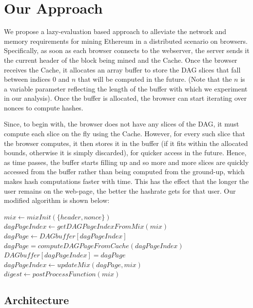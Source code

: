 \documentclass[runningheads]{llncs}
\newcommand{\trishita}[1]{{\color{magenta}\bfseries[Trishita: #1]}}
\begin{document}
\section{Our Approach}
\label{sec:approach}
We propose a lazy-evaluation based approach to alleviate the network and memory requirements for mining Ethereum in a distributed scenario on browsers. Specifically, as soon as each browser connects to the webserver, the server sends it the current header of the block being mined and the Cache. Once the browser receives the Cache, it allocates an array buffer to store the DAG slices that fall between indices 0 and $n$ that will be computed in the future. (Note that the $n$ is a variable parameter reflecting the length of the buffer with which we experiment in our analysis). Once the buffer is allocated, the browser can start iterating over nonces to compute hashes.  

Since, to begin with, the browser does not have any slices of the DAG, it must compute each slice on the fly using the Cache. However, for every such slice that the browser computes, it then stores it in the buffer (if it fits within the allocated bounds, otherwise it is simply discarded), for quicker access in the future. Hence, as time passes, the buffer starts filling up and so more and more slices are quickly accessed from the buffer rather than being computed from the ground-up, which makes hash computations faster with time. This has the effect that the longer the user remains on the web-page, the better the hashrate gets for that user. Our modified algorithm is shown below:

\begin{algorithmic}[H]
\label{modifiedMiningAlgo}
\STATE $mix \gets mixInit(\{header,nonce\})$
  \STATE $dagPageIndex \gets getDAGPageIndexFromMix(mix)$
  \STATE $dagPage \gets DAGbuffer[dagPageIndex]$
		\STATE $dagPage = computeDAGPageFromCache(dagPageIndex)$
        \STATE $DAGbuffer[dagPageIndex] = dagPage$
  \ENDIF  
  \STATE $dagPageIndex \gets updateMix(dagPage,mix)$
\ENDFOR
\STATE $digest \gets postProcessFunction(mix)$
	\RETURN \TRUE
\ENDIF
\RETURN \FALSE
\end{algorithmic}


\subsection{Architecture}
\end{document}
